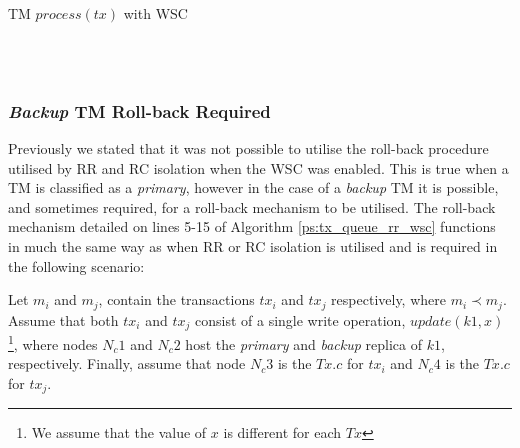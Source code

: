     \begin{algorithm}
        \caption{TM $process(tx)$ with WSC}
        \label{ps:transaction_manager_process_tx}
        \begin{algorithmic}[1]
                \ELSE
	            \ENDIF
            \ENDIF
            \\
	                \ELSE
		                \ENDIF
	                \ENDIF
	            \ENDWHILE
	            \ENDIF
	        \ENDIF
	        \\
        \end{algorithmic}
    \end{algorithm}
    
        \subsubsection*{\emph{Backup} TM Roll-back Required}
        Previously we stated that it was not possible to utilise the roll-back procedure utilised by RR and RC isolation when the WSC was enabled.  This is true when a TM is classified as a \emph{primary}, however in the case of a \emph{backup} TM it is possible, and sometimes required, for a roll-back mechanism to be utilised.  The roll-back mechanism detailed on lines 5-15 of Algorithm \ref{ps:tx_queue_rr_wsc} functions in much the same way as when RR or RC isolation is utilised and is required in the following scenario:
        
        Let $m_i$ and $m_j$, contain the transactions $tx_i$ and $tx_j$ respectively, where $m_i \prec m_j$.  Assume that both $tx_i$ and $tx_j$ consist of a single write operation, $update(k1,x)$ \footnote{We assume that the value of $x$ is different for each $Tx$}, where nodes $N_c1$ and $N_c2$ host the \emph{primary} and \emph{backup} replica of $k1$, respectively.  Finally, assume that node $N_c3$ is the $Tx.c$ for $tx_i$ and $N_c4$ is the $Tx.c$ for $tx_j$. 
        
